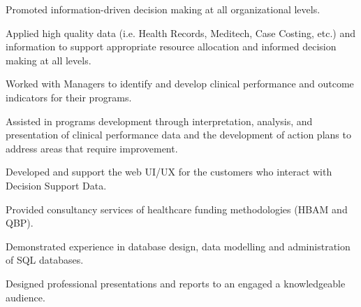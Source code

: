 \begin{cventries}
{\begin{cvitems}
        \item Promoted information-driven decision making at all organizational levels.
        \item Applied high quality data (i.e. Health Records, Meditech, Case Costing, etc.) and information to support appropriate resource allocation and informed decision making at all levels.
        \item Worked with Managers to identify and develop clinical performance and outcome indicators for their programs.
        \item Assisted in programs development through interpretation, analysis, and presentation of clinical performance data and the development of action plans to address areas that require improvement.
        \item Developed and support the web UI/UX for the customers who interact with Decision Support Data.
        \item Provided consultancy services of healthcare funding methodologies (HBAM and QBP).
        \item Demonstrated experience in database design, data modelling and administration of SQL databases.
        \item Designed professional presentations and reports to an engaged a knowledgeable audience.
      \end{cvitems}
    }





\end{cventries}
